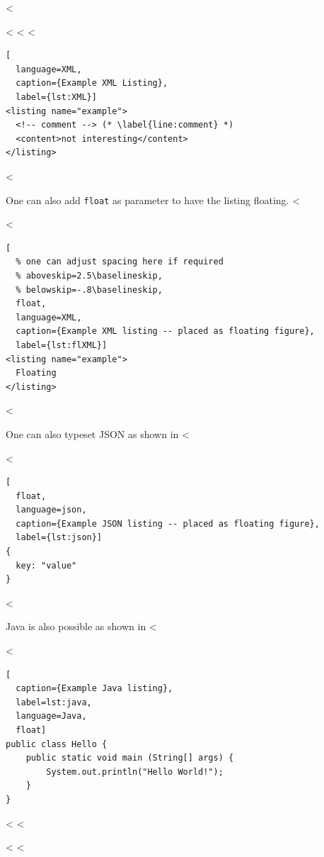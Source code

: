 <%

<%
<%
<%

\begin{lstlisting}[
  language=XML,
  caption={Example XML Listing},
  label={lst:XML}]
<listing name="example">
  <!-- comment --> (* \label{line:comment} *)
  <content>not interesting</content>
</listing>
\end{lstlisting}
<%

One can also add \verb+float+ as parameter to have the listing floating.
<%

<%
\begin{lstlisting}[
  % one can adjust spacing here if required
  % aboveskip=2.5\baselineskip,
  % belowskip=-.8\baselineskip,
  float,
  language=XML,
  caption={Example XML listing -- placed as floating figure},
  label={lst:flXML}]
<listing name="example">
  Floating
</listing>
\end{lstlisting}
<%

One can also typeset JSON as shown in <%

<%
\begin{lstlisting}[
  float,
  language=json,
  caption={Example JSON listing -- placed as floating figure},
  label={lst:json}]
{
  key: "value"
}
\end{lstlisting}
<%

Java is also possible as shown in <%

<%
\begin{lstlisting}[
  caption={Example Java listing},
  label=lst:java,
  language=Java,
  float]
public class Hello {
    public static void main (String[] args) {
        System.out.println("Hello World!");
    }
}
\end{lstlisting}
<%
<%

<%
<%

